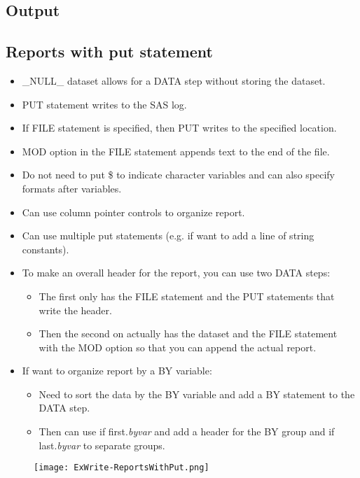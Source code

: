 \documentclass[11pt, oneside]{article}
\begin{document}



\subsection{Output}



\subsection{Reports with put statement}

\begin{itemize}
\item \_NULL\_ dataset allows for a DATA step without storing the dataset.
\item PUT statement writes to the SAS log.
\item If FILE statement is specified, then PUT writes to the specified location.
\item MOD option in the FILE statement appends text to the end of the file.
\item Do not need to put \$ to indicate character variables and can also specify formats after variables.
\item Can use column pointer controls to organize report.
\item Can use multiple put statements (e.g. if want to add a line of string constants).
\item To make an overall header for the report, you can use two DATA steps:
	\begin{itemize}
	\item The first only has the FILE statement and the PUT statements that write the header.
	\item Then the second on actually has the dataset and the FILE statement with the MOD option so that you can append the actual report.
	\end{itemize}
\item If want to organize report by a BY variable:
	\begin{itemize}
	\item Need to sort the data by the BY variable and add a BY statement to the DATA step.
	\item Then can use if first.\textit{byvar} and add a header for the BY group and if last.\textit{byvar} to separate groups.
	\end{itemize}
\end{itemize}


\begin{figure}[H]
\texttt{[image: ExWrite-ReportsWithPut.png]}
\end{figure}
\end{document}
